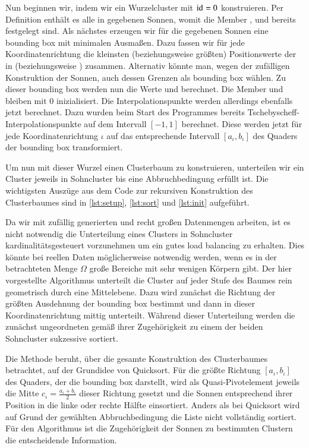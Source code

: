     Nun beginnen wir, indem wir ein Wurzelcluster mit $\tcode{id}=0$ konstruieren. Per Definition enthält es alle in  gegebenen Sonnen, womit die Member ,  und 
     bereits festgelegt sind. Als nächstes erzeugen wir für die gegebenen Sonnen eine bounding box mit minimalen Ausmaßen. Dazu fassen wir für jede Koordinatenrichtung die kleinsten 
    (beziehungsweise größten) Positionswerte der  in  (beziehungsweise ) zusammen. Alternativ könnte man, wegen der zufälligen Konstruktion der Sonnen, auch dessen 
    Grenzen als bounding box wählen. Zu dieser bounding box werden nun die Werte \mbox{} und  berechnet. Die Member  und  bleiben mit $0$ 
    inizialisiert. Die Interpolationspunkte  werden allerdings ebenfalls jetzt berechnet. Dazu wurden beim Start des Programmes bereits Tschebyscheff-Interpolationspunkte auf dem Intervall 
    $[-1,1]$ berechnet. Diese werden jetzt für jede Koordinatenrichtung $\iota$ auf das entsprechende Intervall $[a_\iota, b_\iota]$ des Quaders der bounding box transformiert.
    
    Um nun mit dieser Wurzel einen Clusterbaum zu konstruieren, unterteilen wir ein Cluster jeweils in Sohncluster bis eine Abbruchbedingung erfüllt ist. 
    Die wichtigsten Auszüge aus dem Code zur rekursiven Konstruktion des Clusterbaumes sind in \autoref{lst:setup}, \autoref{lst:sort} und \autoref{lst:init} aufgeführt.
    
    Da wir mit zufällig generierten und recht großen Datenmengen arbeiten, ist es nicht notwendig die Unterteilung eines Clusters in Sohncluster kardinalitätsgesteuert vorzunehmen um ein gutes load 
    balancing zu erhalten. Dies könnte bei reellen Daten möglicherweise notwendig werden, wenn es in der betrachteten Menge $\Omega$ große Bereiche mit sehr wenigen Körpern gibt. 
    Der hier vorgestellte Algorithmus unterteilt die Cluster auf jeder Stufe des Baumes rein geometrisch durch eine Mittelebene. Dazu wird zunächst die Richtung der größten Ausdehnung der bounding
    box bestimmt und dann in dieser Koordinatenrichtung mittig unterteilt. Während dieser Unterteilung werden die zunächst ungeordneten  gemäß ihrer Zugehörigkeit zu einem der beiden
    Sohncluster sukzessive sortiert.
    
    Die Methode  beruht, über die gesamte Konstruktion des Clusterbaumes betrachtet, auf der Grundidee von Quicksort. Für die größte Richtung $[a_\iota, b_\iota]$
    des Quaders, der die bounding box darstellt, wird als Quasi-Pivotelement jeweils die Mitte $c_\iota = \frac{a_\iota + b_\iota}{2}$ dieser Richtung gesetzt und die Sonnen entsprechend ihrer 
    Position in die linke oder rechte Hälfte einsortiert. Anders als bei Quicksort wird auf Grund der gewählten Abbruchbedingung die Liste nicht vollständig sortiert. Für den Algorithmus ist
    die Zugehörigkeit der Sonnen zu bestimmten Clustern die entscheidende Information.
    
